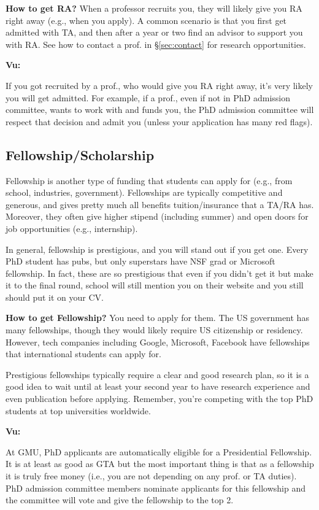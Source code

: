 \documentclass[11pt]{article}
\newenvironment{commentbox}[1][]{
\small
    \begin{cbox}
    \textbf{#1} 
 }{
   \end{cbox}
}
\begin{document}
\textbf{How to get RA?} When a professor recruits you, they will likely give you RA right away (e.g., when you apply).  A common scenario is that you first get admitted with TA, and then after a year or two find an advisor to support you with RA. See how to contact a prof. in \S\ref{sec:contact} for research opportunities.


\begin{commentbox}[Vu:]
If you got recruited by a prof., who would give you RA right away, it's very likely you will get admitted.  For example, if a prof., even if not in PhD admission committee, wants to work with and funds you, the PhD admission committee will respect that decision and admit you (unless your application has many red flags).
\end{commentbox}

\subsection{Fellowship/Scholarship}

Fellowship is another type of funding that students can apply for (e.g., from school, industries, government). Fellowships are typically competitive and generous, and gives pretty much all benefits tuition/insurance that a TA/RA has.  Moreover, they often give higher stipend (including summer) and open doors for job opportunities (e.g., internship).

In general, fellowship is prestigious, and you will stand out if you get one.  Every PhD student has pubs, but only superstars have NSF grad or Microsoft fellowship. In fact, these are so prestigious that even if you didn't get it but make it to the final round, school will still mention you on their website and you still should put it on your CV.


\textbf{How to get Fellowship?} You need to apply for them.  The US government has many fellowships, though they would likely require US citizenship or residency.  However, tech companies including Google, Microsoft, Facebook have fellowships that international students can apply for. 

Prestigious fellowships typically require a clear and good research plan, so it is a good idea to wait until at least your second year to have research experience and even publication before applying. Remember, you're competing with the top PhD students at top universities worldwide. 


\begin{commentbox}[Vu:]
At GMU, PhD applicants are automatically eligible for a Presidential Fellowship.  It is at least as good as GTA but the most important thing is that as a fellowship it is truly free money (i.e., you are not depending on any prof. or TA duties).  PhD admission committee members nominate applicants for this fellowship and the committee will vote and give the fellowship to the top 2.
\end{commentbox}
\end{document}
